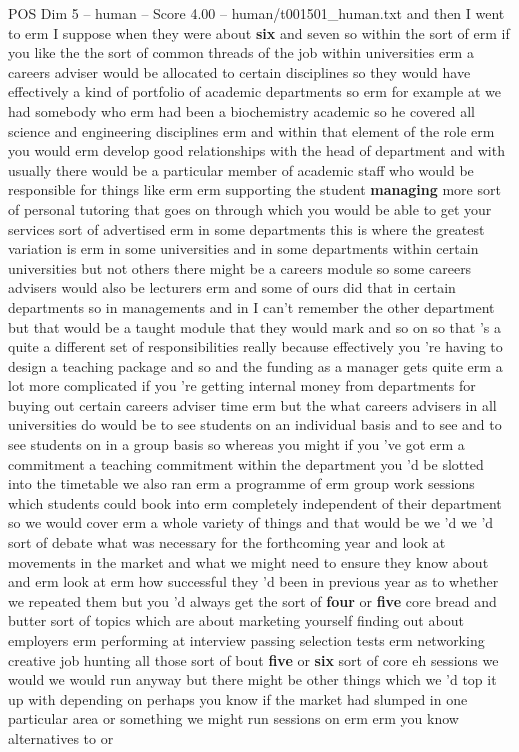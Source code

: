 \begin{textsample}{POS Dim 5 – human – Score 4.00 – human/t001501\_human.txt}  \label{ex:f5_pos_018}
and then I went to erm I suppose when they were about \textbf{six} and seven so within the sort of erm if you like the the sort of common threads of the job within universities erm a careers adviser would be allocated to certain disciplines so they would have effectively a kind of portfolio of academic departments so erm for example at we had somebody who erm had been a biochemistry academic so he covered all science and engineering disciplines erm and within that element of the role erm you would erm develop good relationships with the head of department and with usually there would be a particular member of academic staff who would be responsible for things like erm erm supporting the student \textbf{managing} more sort of personal tutoring that goes on through which you would be able to get your services sort of advertised erm in some departments this is where the greatest variation is erm in some universities and in some departments within certain universities but not others there might be a careers module so some careers advisers would also be lecturers erm and some of ours did that in certain departments so in managements and in I can't remember the other department but that would be a taught module that they would mark and so on so that 's a quite a different set of responsibilities really because effectively you 're having to design a teaching package and so and the funding as a manager gets quite erm a lot more complicated if you 're getting internal money from departments for buying out certain careers adviser time erm but the what careers advisers in all universities do would be to see students on an individual basis and to see and to see students on in a group basis so whereas you might if you 've got erm a commitment a teaching commitment within the department you 'd be slotted into the timetable we also ran erm a programme of erm group work sessions which students could book into erm completely independent of their department so we would cover erm a whole variety of things and that would be we 'd we 'd sort of debate what was necessary for the forthcoming year and look at movements in the market and what we might need to ensure they know about and erm look at erm how successful they 'd been in previous year as to whether we repeated them but you 'd always get the sort of \textbf{four} or \textbf{five} core bread and butter sort of topics which are about marketing yourself finding out about employers erm performing at interview passing selection tests erm networking creative job hunting all those sort of bout \textbf{five} or \textbf{six} sort of core eh sessions we would we would run anyway but there might be other things which we 'd top it up with depending on perhaps you know if the market had slumped in one particular area or something we might run sessions on erm erm you know alternatives to or

\end{textsample}
